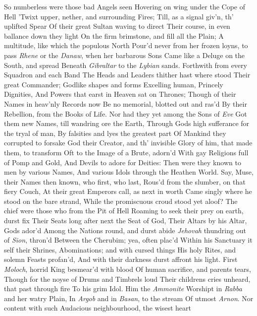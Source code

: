 \documentclass[11pt]{book}
\newcounter {first}
\newcounter {last}
\begin{document}
So numberless were those bad Angels seen 
Hovering on wing under the Cope of Hell 
'Twixt upper, nether, and surrounding Fires; 
Till, as a signal giv'n, th' uplifted Spear 
Of their great Sultan waving to direct 
Their course, in even ballance down they light 
On the firm brimstone, and fill all the Plain; 
A multitude, like which the populous North 
Pour'd never from her frozen loyns, to pass 
\textit{Rhene} or the \textit{Danaw}, when her barbarous Sons 
Came like a Deluge on the South, and spread 
Beneath \textit{Gibraltar} to the \textit{Lybian} sands. 
Forthwith from every Squadron and each Band 
The Heads and Leaders thither hast where stood 
Their great Commander; Godlike shapes and forms 
Excelling human, Princely Dignities, 
And Powers that earst in Heaven sat on Thrones; 
Though of their Names in heav'nly Records now 
Be no memorial, blotted out and ras'd 
By their Rebellion, from the Books of Life. 
Nor had they yet among the Sons of \textit{Eve} 
Got them new Names, till wandring ore the Earth, 
Through Gods high sufferance for the tryal of man, 
By falsities and lyes the greatest part 
Of Mankind they corrupted to forsake 
God their Creator, and th' invisible 
Glory of him, that made them, to transform 
Oft to the Image of a Brute, adorn'd 
With gay Religions full of Pomp and Gold, 
And Devils to adore for Deities: 
Then were they known to men by various Names, 
And various Idols through the Heathen World. 
Say, Muse, their Names then known, who first, who last, 
Rous'd from the slumber, on that fiery Couch, 
At their great Emperors call, as next in worth 
Came singly where he stood on the bare strand, 
While the promiscuous croud stood yet aloof? 
The chief were those who from the Pit of Hell 
Roaming to seek their prey on earth, durst fix 
Their Seats long after next the Seat of God, 
Their Altars by his Altar, Gods ador'd 
Among the Nations round, and durst abide 
\textit{Jehovah} thundring out of \textit{Sion}, thron'd 
Between the Cherubim; yea, often plac'd 
Within his Sanctuary it self their Shrines, 
Abominations; and with cursed things 
His holy Rites, and solemn Feasts profan'd, 
And with their darkness durst affront his light. 
First \textit{Moloch}, horrid King besmear'd with blood 
Of human sacrifice, and parents tears, 
Though for the noyse of Drums and Timbrels loud 
Their childrens cries unheard, that past through fire 
To his grim Idol.  Him the \textit{Ammonite} 
Worshipt in \textit{Rabba} and her watry Plain, 
In \textit{Argob} and in \textit{Basan}, to the stream 
Of utmost \textit{Arnon}.  Nor content with such 
Audacious neighbourhood, the wisest heart 
\end{document}
